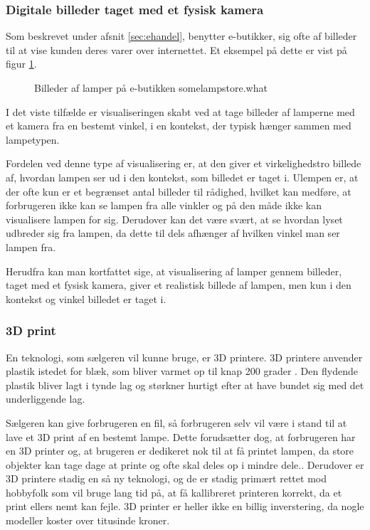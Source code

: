 \subsubsection{Digitale billeder taget med et fysisk kamera}
Som beskrevet under afsnit \ref{sec:ehandel}, benytter e-butikker, sig ofte af billeder til at vise kunden deres varer over internettet. Et eksempel på dette er vist på figur \ref{fig:e_handel_lampebilleder}.

\begin{figure}[H]
    \centering
    \fbox{\rule{\textwidth}{5cm}}
    \caption{Billeder af lamper på e-butikken somelampstore.what}
    \label{fig:e_handel_lampebilleder}
\end{figure} 

I det viste tilfælde er visualiseringen skabt ved at tage billeder af lamperne med et kamera fra en bestemt vinkel, i en kontekst, der typisk hænger sammen med lampetypen. 

Fordelen ved denne type af visualisering er, at den giver et virkelighedstro billede af, hvordan lampen ser ud i den kontekst, som billedet er taget i. Ulempen er, at der ofte kun er et begrænset antal billeder til rådighed, hvilket kan medføre, at forbrugeren ikke kan se lampen fra alle vinkler og på den måde ikke kan visualisere lampen for sig. Derudover kan det være svært, at se hvordan lyset udbreder sig fra lampen, da dette til dels afhænger af hvilken vinkel man ser lampen fra. 

Herudfra kan man kortfattet sige, at visualisering af lamper gennem billeder, taget med et fysisk kamera, giver et realistisk billede af lampen, men kun i den kontekst og vinkel billedet er taget i. 

\subsubsection{3D print}
En teknologi, som sælgeren vil kunne bruge, er 3D printere. 3D printere anvender plastik istedet for blæk, som bliver varmet op til knap 200 grader \cite{hvordan_3Dprinter}. Den flydende plastik bliver lagt i tynde lag og størkner hurtigt efter at have bundet sig med det underliggende lag. 

Sælgeren kan give forbrugeren en fil, så forbrugeren selv vil være i stand til at lave et 3D print af en bestemt lampe. Dette forudsætter dog, at forbrugeren har en 3D printer og, at brugeren er dedikeret nok til at få printet lampen, da store objekter kan tage dage at printe og ofte skal deles op i mindre dele.\cite{hvordan_3Dprinter}. Derudover er 3D printere stadig en så ny teknologi, og de er stadig primært rettet mod hobbyfolk som vil bruge lang tid på, at få kallibreret printeren korrekt, da et print ellers nemt kan fejle. 3D printer er heller ikke en billig inverstering, da nogle modeller koster over titusinde kroner\cite{3D_printer}. 

